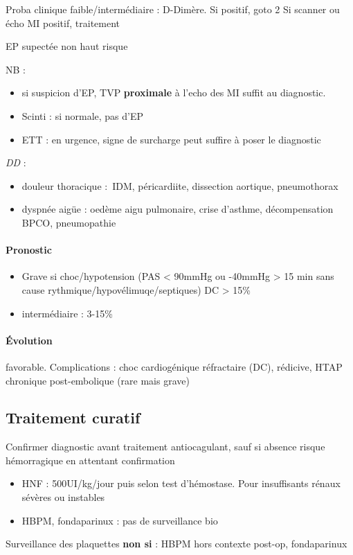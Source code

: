 \documentclass{article}
\begin{document}
\begin{algorithm}
  Proba clinique faible/intermédiaire : D-Dimère. Si positif, goto 2\;
  Si scanner ou écho MI positif, traitement\;
  \caption{EP supectée non haut risque}
\end{algorithm}

NB : 
\begin{itemize}
  \item si suspicion d'EP, TVP \textbf{proximale} à l'echo des MI suffit au
diagnostic.
  \item Scinti : si normale, pas d'EP
  \item ETT : en urgence, signe de surcharge peut suffire à poser le diagnostic
\end{itemize}

\textit{DD} :
\begin{itemize}
  \item douleur thoracique : IDM, péricardiite, dissection aortique,
    pneumothorax
  \item dyspnée aigüe : oedème aigu pulmonaire, crise d'asthme, décompensation
    BPCO, pneumopathie
\end{itemize}

\paragraph{Pronostic}
\begin{itemize}
  \item Grave si choc/hypotension (PAS < 90mmHg ou -40mmHg > 15 min sans cause
rythmique/hypovélimuqe/septiques) \thus DC > 15\%
\item intermédiaire : 3-15\%
\end{itemize}

\paragraph{Évolution} favorable. Complications : choc cardiogénique réfractaire
(DC), rédicive, HTAP chronique post-embolique (rare mais grave)

\subsection{Traitement curatif}
Confirmer diagnostic avant traitement antiocagulant, sauf si absence risque
hémorragique en attentant confirmation

\begin{itemize}
  \item HNF : 500UI/kg/jour puis selon test d'hémostase. Pour insuffisants
    rénaux sévères ou instables
  \item HBPM, fondaparinux : pas de surveillance bio
\end{itemize}
Surveillance des plaquettes \textbf{non si}  : HBPM hors contexte post-op,
fondaparinux 
\end{document}
